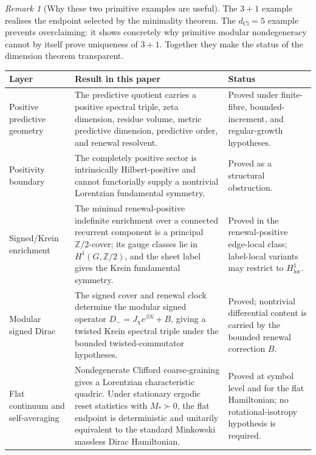 \documentclass[11pt]{article}
\theoremstyle{definition}
\theoremstyle{remark}
\newtheorem{remark}[theorem]{Remark}
\newcommand{\dCl}{d_{\mathrm{Cl}}}
\begin{document}
\begin{remark}[Why these two primitive examples are useful]
\label{rem:primitive-examples-use}
The \(3+1\) example realises the endpoint selected by the minimality theorem.
The \(\dCl=5\) example prevents overclaiming: it shows concretely why primitive
modular nondegeneracy cannot by itself prove uniqueness of \(3+1\).  Together
they make the status of the dimension theorem transparent.
\end{remark}


\begin{table}[t]
\centering
\small
\renewcommand{\arraystretch}{1.18}
\begin{tabularx}{\textwidth}{%
  >{\raggedright\arraybackslash}p{}
  >{\raggedright\arraybackslash}X
  >{\raggedright\arraybackslash}p{}}
\toprule
\textbf{Layer} & \textbf{Result in this paper} & \textbf{Status} \\
\midrule

Positive predictive geometry &
The predictive quotient carries a positive spectral triple, zeta dimension,
residue volume, metric predictive dimension, predictive order, and renewal
resolvent. &
Proved under finite-fibre, bounded-increment, and regular-growth hypotheses. \\[3pt]

Positivity boundary &
The completely positive sector is intrinsically Hilbert-positive and cannot
functorially supply a nontrivial Lorentzian fundamental symmetry. &
Proved as a structural obstruction. \\[3pt]

Signed/Krein enrichment &
The minimal renewal-positive indefinite enrichment over a connected recurrent
component is a principal \(\mathbb Z/2\)-cover; its gauge classes lie in
\(H^1(G,\mathbb Z/2)\), and the sheet label gives the Krein fundamental
symmetry. &
Proved in the renewal-positive edge-local class; label-local variants may
restrict to \(H^1_{\mathrm{loc}}\). \\[3pt]

Modular signed Dirac &
The signed cover and renewal clock determine the modular signed operator
\(D_-=J_\chi e^{\beta N}+B\), giving a twisted Krein spectral triple under the
bounded twisted-commutator hypotheses. &
Proved; nontrivial differential content is carried by the bounded renewal
correction \(B\). \\[3pt]

Flat continuum and self-averaging &
Nondegenerate Clifford coarse-graining gives a Lorentzian characteristic
quadric.  Under stationary ergodic reset statistics with \(M_*\succ0\), the
flat endpoint is deterministic and unitarily equivalent to the standard
Minkowski massless Dirac Hamiltonian. &
Proved at symbol level and for the flat Hamiltonian; no rotational-isotropy
hypothesis is required. \\[3pt]


\end{tabularx}
\end{table}
\end{document}
